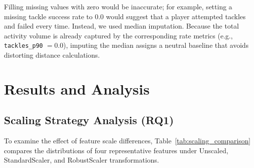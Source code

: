 \documentclass[12pt]{ai_conquer2026}
\begin{document}
Filling missing values with zero would be inaccurate; for example, setting a missing tackle success rate to 0.0 would suggest that a player attempted tackles and failed every time. Instead, we used median imputation. Because the total activity volume is already captured by the corresponding rate metrics (e.g., \texttt{tackles\_p90} $= 0.0$), imputing the median assigns a neutral baseline that avoids distorting distance calculations.

\section{Results and Analysis}
\label{sec:results}

\subsection{Scaling Strategy Analysis (RQ1)}
To examine the effect of feature scale differences, Table~\ref{tab:scaling_comparison} compares the distributions of four representative features under Unscaled, StandardScaler, and RobustScaler transformations.
\end{document}
